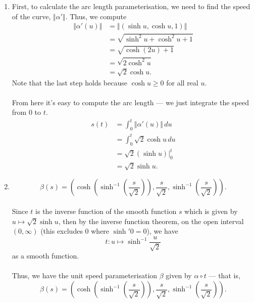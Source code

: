\documentclass[12 pt, letterpaper]{hmcpset}
\begin{document}
\begin{solution}
	\begin{enumerate}
		\item First, to calculate the arc length parameterisation, we need to find the speed of the curve, $\Vert \alpha' \Vert$. Thus, we compute
			\[
				\begin{split}
					\Vert \alpha'(u) \Vert & = \Vert (\sinh{u}, \cosh{u}, 1) \Vert \\
							       & = \sqrt{\sinh^{2}{u} + \cosh^{2}{u} + 1} \\
							       & = \sqrt{\cosh(2u) + 1} \\
							       & = \sqrt{2 \cosh^{2}{u}} \\
							       & = \sqrt 2 \cosh u.
				\end{split}
			\]
			Note that the last step holds because $\cosh{u} \ge 0$ for all real $u$. \\\\
			From here it's easy to compute the arc length --- we just integrate the speed from $0$ to $t$.
			\[
				\begin{split}
					s(t) & = \int_{0}^{t} \Vert \alpha'(u) \Vert \, du \\
					     & = \int_{0}^{t} \sqrt 2 \cosh{u} \, du \\
					     & = \sqrt 2 \left ( \sinh{u} \right )\Big |_{0}^{t} \\
					     & = \sqrt 2 \sinh{u}.
				\end{split}
			\]
	\item
		\[
			\boxed{
				\beta(s) = \left ( \cosh \left ( \sinh^{-1} \left ( {\frac{s}{\sqrt 2}} \right ) \right ), \frac{s}{\sqrt 2}, \sinh^{-1} \left ( \frac{s}{\sqrt 2} \right ) \right ).
			}
		\]\\
		Since $t$ is the inverse function of the smooth function $s$ which is given by $u \mapsto \sqrt 2 \sinh{u}$, then by the inverse function theorem, on the open interval $(0, \infty)$ (this excludes $0$ where $\sinh'{0} = 0$), we have
		\[
			t : u \mapsto \sinh^{-1}{\frac{u}{\sqrt 2}}
		\]
		as a smooth function. \\\\
		Thus, we have the unit speed parameterisation $\beta$ given by $\alpha \circ t$ --- that is,
		\[
			\beta(s) = \left ( \cosh \left ( \sinh^{-1} \left ( {\frac{s}{\sqrt 2}} \right ) \right ), \frac{s}{\sqrt 2}, \sinh^{-1} \left ( \frac{s}{\sqrt 2} \right ) \right ).
		\]
	\end{enumerate}
\end{solution}
\end{document}
